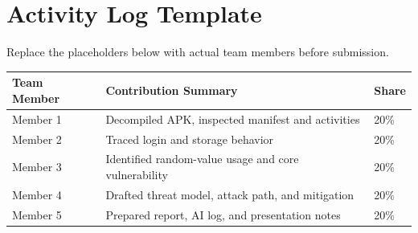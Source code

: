 ﻿\documentclass[11pt,letterpaper]{article}
\begin{document}
\section*{Activity Log Template}
Replace the placeholders below with actual team members before submission.

\begin{tabular}{|p{}|p{}|p{}|}
\hline
\textbf{Team Member} & \textbf{Contribution Summary} & \textbf{Share} \\
\hline
Member 1 & Decompiled APK, inspected manifest and activities & 20\% \\
\hline
Member 2 & Traced login and storage behavior & 20\% \\
\hline
Member 3 & Identified random-value usage and core vulnerability & 20\% \\
\hline
Member 4 & Drafted threat model, attack path, and mitigation & 20\% \\
\hline
Member 5 & Prepared report, AI log, and presentation notes & 20\% \\
\hline
\end{tabular}
\end{document}
